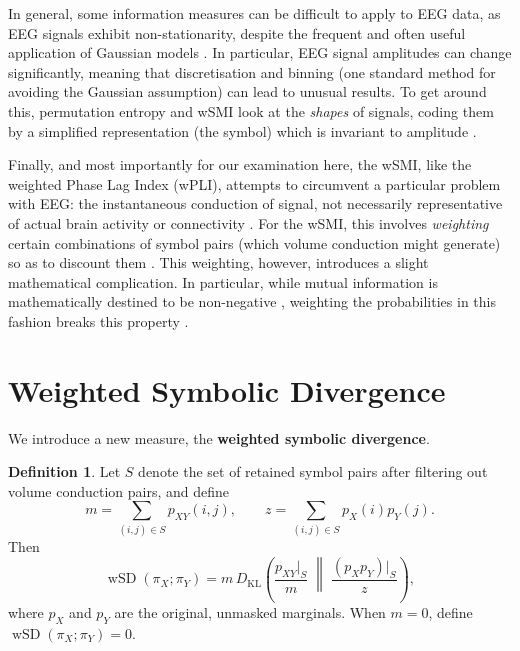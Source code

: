 \documentclass[twocolumns]{IEEEtran}%
\theoremstyle{definition}
\newtheorem{definition}[proposition]{Definition}
\begin{document}
In general, some information measures can be difficult to apply to EEG data, as EEG signals exhibit non-stationarity, despite the frequent and often useful application of Gaussian models \cite{ince2017statistical}. In particular, EEG signal amplitudes can change significantly, meaning that discretisation and binning (one standard method for avoiding the Gaussian assumption) can lead to unusual results. To get around this, permutation entropy and wSMI look at the \textit{shapes} of signals, coding them by a simplified representation (the symbol) which is invariant to amplitude \cite{bandt2002permutation, king2013information}.

Finally, and most importantly for our examination here, the wSMI, like the weighted Phase Lag Index (wPLI), attempts to circumvent a particular problem with EEG: the instantaneous conduction of signal, not necessarily representative of actual brain activity or connectivity \cite{nobody}. For the wSMI, this involves \textit{weighting} certain combinations of symbol pairs (which volume conduction might generate) so as to discount them \cite{king2013information, imperatori2019eeg}. This weighting, however, introduces a slight mathematical complication. In particular, while mutual information is mathematically destined to be non-negative \cite{shannon1948mathematical}, weighting the probabilities in this fashion breaks this property \cite{imperatori2019eeg, kvaalseth1991relative}.

\section{Weighted Symbolic Divergence}

We introduce a new measure, the \textbf{weighted symbolic divergence}.

\begin{definition}
Let $S$ denote the set of retained symbol pairs after filtering out volume conduction pairs, and define
\[
m = \sum_{(i,j)\in S} p_{XY}(i,j),
\qquad
z = \sum_{(i,j)\in S} p_X(i)p_Y(j).
\]
Then
\[
\operatorname{wSD}(\pi_X;\pi_Y)
=
m\,D_{\mathrm{KL}}\!\left(
\frac{p_{XY}|_S}{m}
\;\middle\|\;
\frac{(p_Xp_Y)|_S}{z}
\right),
\]
where $p_X$ and $p_Y$ are the original, unmasked marginals.
When $m=0$, define $\operatorname{wSD}(\pi_X;\pi_Y)=0$.
\end{definition}
\end{document}
